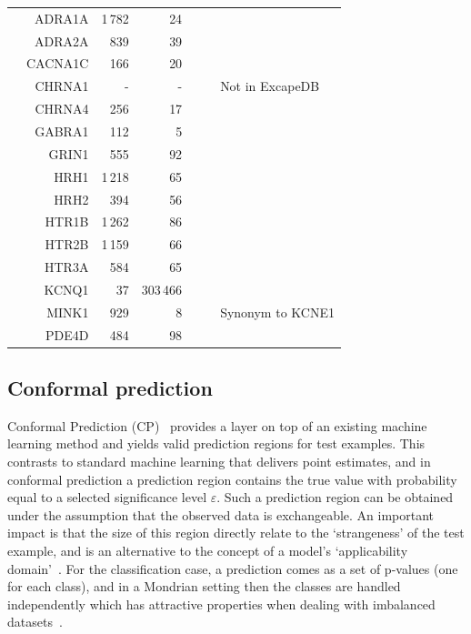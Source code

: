 \documentclass[utf8]{frontiersSCNS} %
\begin{document}
\begin{table}[p]
\begin{tabular}{crrrrcl}
&    ADRA1A  &       1\,782  &       24          &            &       &       \\
&    ADRA2A  &       839     &       39          &            &       &       \\
&    CACNA1C &       166     &       20          &            &       &       \\
&    CHRNA1  &       -       &       -           &            &       & Not in ExcapeDB \\
&    CHRNA4  &       256     &       17          &            &       &       \\
&    GABRA1  &       112     &       5           &            &       &       \\
&    GRIN1   &       555     &       92          &            &       &       \\
&    HRH1    &       1\,218  &       65          &            &       &       \\
&    HRH2    &       394     &       56          &            &       &       \\
&    HTR1B   &       1\,262  &       86          &            &       &       \\
&    HTR2B   &       1\,159  &       66          &            &       &       \\
&    HTR3A   &       584     &       65          &            &       &       \\
&    KCNQ1   &       37      &       303\,466    &            &       &       \\
&    MINK1   &       929     &       8           &            &       & Synonym to KCNE1 \\
&    PDE4D   &       484     &       98          &            &       &       \\

\bottomrule
\end{tabular}
\end{table}

\subsection{Conformal prediction}
Conformal Prediction (CP)~\cite{Vovk2005} provides a layer on top of an
existing machine learning method and yields valid prediction regions for test
examples. This contrasts to standard machine learning that delivers point
estimates, and in conformal prediction a prediction region contains the true
value with probability equal to a selected significance level $\varepsilon$. Such
a prediction region can be obtained under the assumption that the observed data
is exchangeable. An important impact is that the size of this region directly
relate to the `strangeness' of the test example, and is an alternative to the
concept of a model's `applicability domain'~\cite{norinder2014introducing}. For
the classification case, a prediction comes as a set of p-values (one for each
class), and in a Mondrian setting then the classes are handled independently
which has attractive properties when dealing with imbalanced
datasets~\cite{Norinder:2017qc,Sun:2017qm}.
\end{document}
